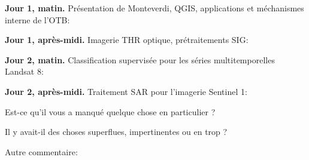 \documentclass[10pt,a4paper]{article}
\begin{document}
\textbf{Jour 1, matin.} Présentation de Monteverdi, QGIS, applications et méchanismes interne de l'OTB:
\moduleanswer

\textbf{Jour 1, après-midi.} Imagerie THR optique, prétraitements SIG:
\moduleanswer

\textbf{Jour 2, matin.} Classification supervisée pour les séries multitemporelles Landsat 8:
\moduleanswer

\textbf{Jour 2, après-midi.} Traitement SAR pour l'imagerie Sentinel 1:
\moduleanswer

Est-ce qu'il vous a manqué quelque chose en particulier ?
\vspace{10em}

Il y avait-il des choses superflues, impertinentes ou en trop ?
\vspace{10em}

Autre commentaire:
\vspace{10em}
\end{document}

